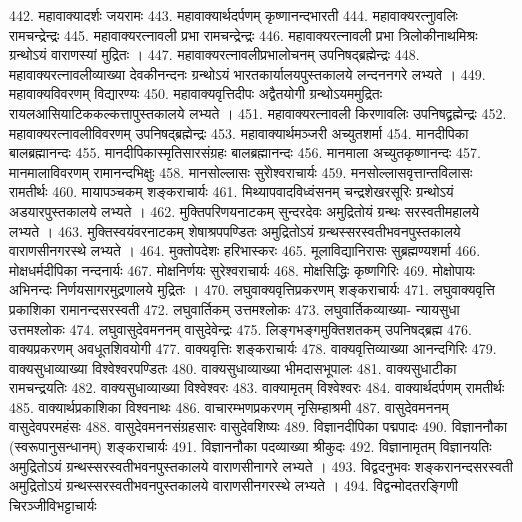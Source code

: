 442. महावाक्यादर्शः					जयरामः
443. महावाक्यार्थदर्पणम्				कृष्णानन्दभारती
444. महावाक्यरत्नाुवलिः				रामचन्द्रेन्द्रः
445. महावाक्यरत्नावली प्रभा			रामचन्द्रेन्द्रः
446. महावाक्यरत्नावली प्रभा			त्रिलोकीनाथमिश्रः
		ग्रन्थोऽयं वाराणस्यां मुद्रितः ।
447. महावाक्यरत्नावलीप्रभालोचनम् 	उपनिषद्ब्रह्मेन्द्रः
448. महावाक्यरत्नावलीव्याख्या		देवकीनन्दनः
		ग्रन्थोऽयं भारतकार्यालयपुस्तकालये लन्दननगरे लभ्यते । 
449. महावाक्यविवरणम्				विद्यारण्यः
450. महावाक्यवृत्तिदीपः 				अद्वैतयोगी
		ग्रन्थोऽयममुद्रितः रायलआसियाटिककल्कत्तापुस्तकालये लभ्यते । 
451. महावाक्यरत्नावली किरणावलिः	उपनिषद्व्रह्मेन्द्रः
452. महावाक्यरत्नावलीविवरणम् 		उपनिषद्ब्रह्मेन्द्रः
453. महावाक्यार्थमञ्जरी					अच्युतशर्मा
454. मानदीपिका						बालब्रह्मानन्दः
455. मानदीपिकास्मृतिसारसंग्रहः		बालब्रह्मानन्दः
456. मानमाला							अच्युतकृष्णानन्दः
457. मानमालाविवरणम् 				रामानन्दभिक्षुः
458. मानसोल्लासः						सुरोेश्वराचार्यः
459. मनसोल्लासवृत्तान्तविलासः		रामतीर्थः
460. मायापञ्चकम् 						शङ्कराचार्यः
461. मिथ्यापवादविध्वंसनम् 			चन्द्रशेखरसूरिः
		ग्रन्थोऽयं अडयारपुस्तकालये लभ्यते । 
462. मुक्तिपरिणयनाटकम्				सुन्दरदेवः
		अमुद्रितोयं ग्रन्थः सरस्वतीमहालये लभ्यते ।
463. मुक्तिस्वयंवरनाटकम् 				शेषाश्रपपण्डितः
		अमुद्रितोऽयं ग्रन्थस्सरस्वतीभवनपुस्तकालये वाराणसीनगरस्थे लभ्यते ।
464. मुक्तोपदेशः							हरिभास्करः
465. मूलाविद्यानिरासः					सुब्रह्मण्यशर्मा
466. मोक्षधर्मदीपिका 					नन्दनार्यः
467. मोक्षनिर्णयः						सुरेश्वराचार्यः
468. मोक्षसिद्धिः							कृष्णगिरिः
469. मोक्षोपायः							अभिनन्दः
		निर्णयसागरमुद्रणालये मुद्रितः ।
470. लघुवाक्यवृत्तिप्रकरणम् 			शङ्कराचार्यः
471. लघुवाक्यवृत्ति प्रकाशिका			रामानन्दसरस्वती
472. लघुवार्तिकम्						उत्तमश्लोकः
473. लघुवार्तिकव्याख्या- न्यायसुधा	उत्तमश्लोकः
474. लघुवासुदेवमननम्					वासुदेवेन्द्रः
475. लिङ्गभङ्गमुक्तिशतकम् 				उपनिषद्ब्रह्म
476. वाक्यप्रकरणम् 					अवधूतशिवयोगी
477. वाक्यवृत्तिः						शङ्कराचार्यः
478. वाक्यवृत्तिव्याख्या					आनन्दगिरिः
479. वाक्यसुधाव्याख्या					विश्वेश्वरपण्डितः
480. वाक्यसुधाव्याख्या					भीमदासभूपालः
481. वाक्यसुधाटीका					रामचन्द्रयतिः
482. वाक्यसुधाव्याख्या 				विश्वेश्वरः
483. वाक्यामृतम् 						विश्वेश्वरः
484. वाक्यार्थदर्पणम्					रामतीर्थः
485. वाक्यार्थप्रकाशिका				विश्वनाथः
486. वाचारम्भणप्रकरणम्				नृसिम्हाश्रमी
487. वासुदेवमननम्						वासुदेवपरमहंसः
488. वासुदेवमननसंग्रहसारः			वासुदेवशिष्यः
489. विज्ञानदीपिका						पद्मपादः
490. विज्ञाननौका (स्वरूपानुसन्धानम्) शङ्कराचार्यः
491. विज्ञाननौका पदव्याख्या			श्रीकुदः
492. विज्ञानामृतम्						विज्ञानयतिः
		अमुद्रितोऽयं ग्रन्थस्सरस्वतीभवनपुस्तकालये वाराणसीनागरे लभ्यते । 
493. विद्वदनुभवः 						शङ्करानन्दसरस्वती
		अमुद्रितोऽयं ग्रन्थस्सरस्वतीभवनपुस्तकालये वाराणसीनगरस्थे लभ्यते ।
494. विद्वन्मोदतरङ्गिणी					चिरञ्जीविभट्टाचार्यः
